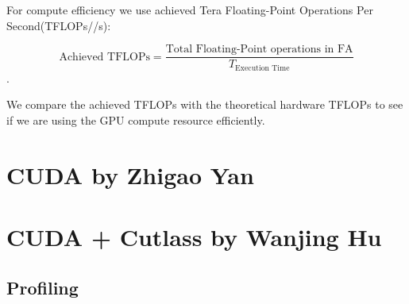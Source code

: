 \documentclass[11pt]{article}
\begin{document}
For compute efficiency we use achieved Tera Floating-Point Operations Per Second(TFLOPs//s): 

$$\text{Achieved TFLOPs} = \frac{\text{Total Floating-Point operations in FA}}{T_{\text{Execution Time}}}$$.

We compare the achieved TFLOPs with the theoretical hardware TFLOPs to see if we are using the GPU compute resource efficiently.




 \begin{comment}
\begin{algorithm}[htbp]
  \caption{Standard Attention}
  \label{alg:standard_attention}
  \begin{algorithmic}[1]
    \STATE Load $Q$ and $K$ by blocks from HBM.
    \STATE Compute $S = (1/\sqrt{d})QK^T$ (GEMM-I).
    \STATE Write $S$ to HBM.
    \STATE Read $S$ from HBM.
    \STATE Compute $S = S - \text{rowmax}(S)$.
    \STATE Compute $P = \text{softmax}(S)$.
    \STATE Write $P$ to HBM.
    \STATE Load $P$ and $V$ by blocks from HBM.
    \STATE Compute $O = PV$ (GEMM-II).
    \STATE Write $O$ to HBM.
  \end{algorithmic}
\end{algorithm}
\end{comment}

\section{CUDA by Zhigao Yan}

\section{CUDA + Cutlass by Wanjing Hu}

\subsection{Profiling}
\end{document}
